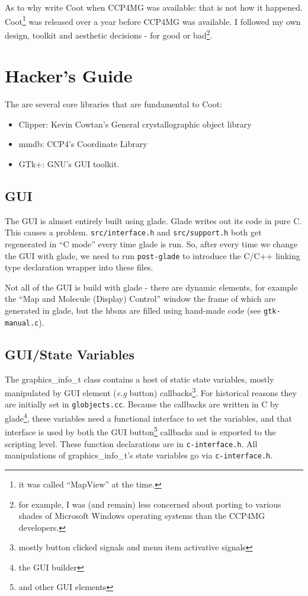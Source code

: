 \documentclass{book}
\begin{document}
As to why write Coot when CCP4MG was available: that is not how it
happened. Coot\footnote{it was called ``MapView'' at the time.} was
released over a year before CCP4MG was available.  I followed my own
design, toolkit and aesthetic decisions - for good or bad\footnote{for
  example, I was (and remain) less concerned about porting to various
  shades of Microsoft Windows operating systems than the CCP4MG
  developers.}.

\section{Hacker's Guide}

The are several core libraries that are fundamental to Coot:

\begin{itemize}
\item Clipper: Kevin Cowtan's General crystallographic object library
\item mmdb: CCP4's Coordinate Library
\item GTk+: GNU's GUI toolkit.
\end{itemize}

\subsection{GUI}
The GUI is almost entirely built using glade.  Glade writes out its
code in pure C.  This causes a problem.  \texttt{src/interface.h} and
\texttt{src/support.h} both get regenerated in ``C mode'' every time
glade is run.  So, after every time we change the GUI with glade, we
need to run \texttt{post-glade} to introduce the C/C++ linking type
declaration wrapper into these files.

Not all of the GUI is build with glade - there are dynamic elements,
for example the ``Map and Molecule (Display) Control'' window the
frame of which are generated in glade, but the hboxs are filled using
hand-made code (see \texttt{gtk-manual.c}).

\subsection{GUI/State Variables}
The graphics\_info\_t class contains a host of static state variables,
mostly manipulated by GUI element (\emph{e.g} button)
callbacks\footnote{mostly button clicked signals and menu item
  activative signals}. For historical reasons they are initially set
in \texttt{globjects.cc}.  Because the callbacks are written in C by
glade\footnote{the GUI builder}, these variables need a functional
interface to set the variables, and that interface is used by both the
GUI button\footnote{and other GUI elements} callbacks and is exported
to the scripting level.  These function declarations are in
\texttt{c-interface.h}.  All manipulations of graphics\_info\_t's
state variables go via \texttt{c-interface.h}.
\end{document}
